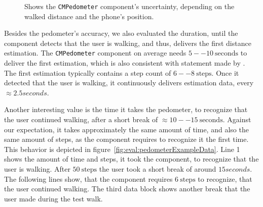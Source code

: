 \begin{figure}
  \caption {Shows the \texttt{CMPedometer} component's uncertainty, depending on the walked distance and the phone's position.}
  \label{fig:eval:pedometerNDF}
\end{figure}


Besides the pedometer's accuracy, we also evaluated the duration, until the component detects that the user is walking, and thus, delivers the first distance estimation. The \texttt{CMPedometer} component on average needs $5--10~\text{seconds}$ to deliver the first estimation, which is also consistent with statement made by \citet{apple:wwdc_2014_pham}. The first estimation typically contains a step count of $6--8~\text{steps}$. Once it detected that the user is walking, it continuously delivers estimation data, every $\approx 2.5 seconds$.

Another interesting value is the time it takes the pedometer, to recognize that the user continued walking, after a short break of $\approx 10--15~\text{seconds}$. Against our expectation, it takes approximately the same amount of time, and also the same amount of steps, as the component requires to recognize it the first time. This behavior is depicted in figure~\ref{fig:eval:pedometerExampleData}. Line 1 shows the amount of time and steps, it took the component, to recognize that the user is walking. After $50~\text{steps}$ the user took a short break of around $15 seconds$. The following lines show, that the component requires $6~\text{steps}$ to recognize, that the user continued walking. The third data block shows another break that the user made during the test walk.

